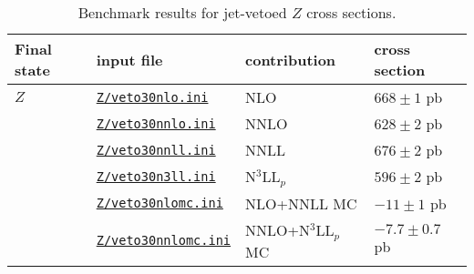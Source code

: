 \renewcommand{\arraystretch}{1.05}
\begin{table}
\begin{tabular}{llll}
\hline
Final state & input file & contribution & cross section \\
\hline
$Z$ & \href{\mcfmprocs/Files31/jetveto/veto30nlo.ini}{\texttt{Z/veto30nlo.ini}}        & NLO                 & $668 \pm 1$ pb \\
    & \href{\mcfmprocs/Files31/jetveto/veto30nnlo.ini}{\texttt{Z/veto30nnlo.ini}}      & NNLO                & $628 \pm 2$ pb \\
    & \href{\mcfmprocs/Files31/jetveto/veto30nnll.ini}{\texttt{Z/veto30nnll.ini}}      & NNLL                & $676 \pm 2$ pb \\
    & \href{\mcfmprocs/Files31/jetveto/veto30n3ll.ini}{\texttt{Z/veto30n3ll.ini}}      & N$^3$LL$_p$         & $596 \pm 2$ pb \\
    & \href{\mcfmprocs/Files31/jetveto/veto30nlomc.ini}{\texttt{Z/veto30nlomc.ini}}    & NLO+NNLL MC         & $-11 \pm 1$ pb \\
    & \href{\mcfmprocs/Files31/jetveto/veto30nnlomc.ini}{\texttt{Z/veto30nnlomc.ini}}  & NNLO+N$^3$LL$_p$ MC & $-7.7 \pm 0.7$ pb \\[2pt]
\hline
\end{tabular}
\caption{Benchmark results for jet-vetoed $Z$ cross sections.}
\label{table:jetveto_Z}
\end{table}
\renewcommand{\arraystretch}{1.0}
